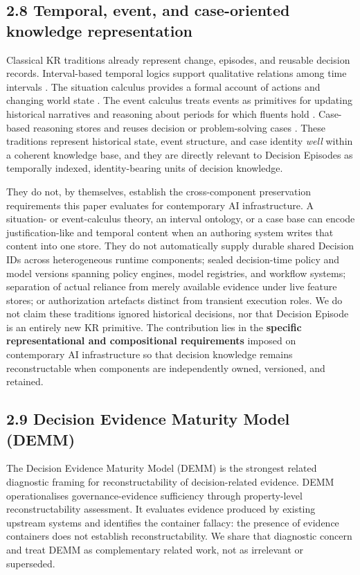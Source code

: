 \documentclass[11pt,a4paper]{article}
\begin{document}
\subsection{2.8 Temporal, event, and case-oriented knowledge representation}

Classical KR traditions already represent change, episodes, and reusable decision records. Interval-based temporal logics support qualitative relations among time intervals \citep{allen1983temporalIntervals}. The situation calculus provides a formal account of actions and changing world state \citep{mccarthy1969situationCalculus}. The event calculus treats events as primitives for updating historical narratives and reasoning about periods for which fluents hold \citep{kowalski1986eventCalculus}. Case-based reasoning stores and reuses decision or problem-solving cases \citep{aamodt1994caseBasedReasoning}. These traditions represent historical state, event structure, and case identity \emph{well} within a coherent knowledge base, and they are directly relevant to Decision Episodes as temporally indexed, identity-bearing units of decision knowledge.


They do not, by themselves, establish the cross-component preservation requirements this paper evaluates for contemporary AI infrastructure. A situation- or event-calculus theory, an interval ontology, or a case base can encode justification-like and temporal content when an authoring system writes that content into one store. They do not automatically supply durable shared Decision IDs across heterogeneous runtime components; sealed decision-time policy and model versions spanning policy engines, model registries, and workflow systems; separation of actual reliance from merely available evidence under live feature stores; or authorization artefacts distinct from transient execution roles. We do not claim these traditions ignored historical decisions, nor that Decision Episode is an entirely new KR primitive. The contribution lies in the \textbf{specific representational and compositional requirements} imposed on contemporary AI infrastructure so that decision knowledge remains reconstructable when components are independently owned, versioned, and retained.


\subsection{2.9 Decision Evidence Maturity Model (DEMM)}

The Decision Evidence Maturity Model (DEMM) \citep{solozobov2026demm} is the strongest related diagnostic framing for reconstructability of decision-related evidence. DEMM operationalises governance-evidence sufficiency through property-level reconstructability assessment. It evaluates evidence produced by existing upstream systems and identifies the container fallacy: the presence of evidence containers does not establish reconstructability. We share that diagnostic concern and treat DEMM as complementary related work, not as irrelevant or superseded.
\end{document}
